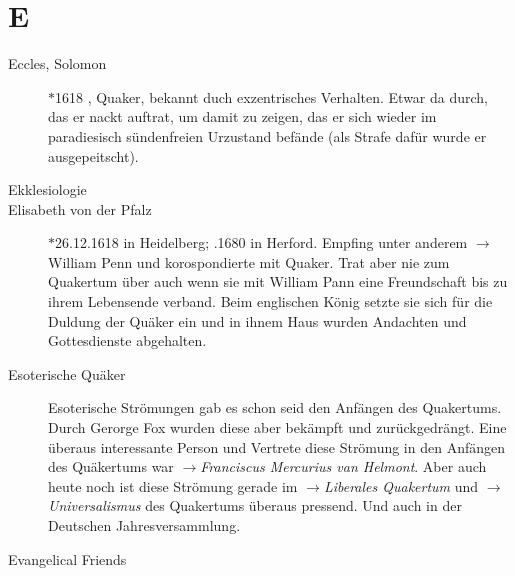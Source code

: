\section*{E}

\articlesize

\begin{description}

 \item[Eccles, Solomon] $\ast$1618 , Quaker,  bekannt duch exzentrisches Verhalten. Etwar da durch, das er nackt auftrat, um damit zu zeigen, das er sich wieder im paradiesisch sündenfreien Urzustand befände (als Strafe dafür wurde er ausgepeitscht).

 \item[Ekklesiologie]

 \item[Elisabeth von der Pfalz] $\ast$26.12.1618 in Heidelberg; .1680 in Herford. Empfing unter anderem $\to$William Penn und korospondierte mit Quaker. Trat aber nie zum Quakertum über auch wenn sie mit William Pann eine Freundschaft bis zu ihrem Lebensende verband. Beim englischen König setzte sie sich für die Duldung der Quäker ein und in ihnem Haus wurden Andachten und Gottesdienste abgehalten.

  \item[Esoterische Quäker] Esoterische Strömungen gab es schon seid den Anfängen
  des Quakertums. Durch Gerorge Fox wurden diese aber bekämpft und zurückgedrängt.
  Eine überaus interessante Person und Vertrete diese Strömung in den Anfängen
  des Quäkertums war $\to$\textit{Franciscus Mercurius van Helmont}. Aber auch
  heute noch ist diese Strömung gerade im $\to$\textit{Liberales Quakertum} und
  $\to$\textit{Universalismus} des Quakertums überaus pressend. Und auch in der
  Deutschen Jahresversammlung.

 \item[Evangelical Friends]



\end{description}

